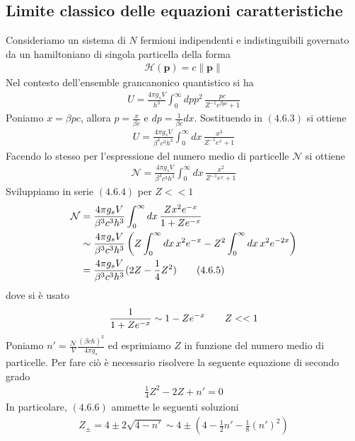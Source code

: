 \documentclass{article}
\begin{document}
\subsection{Limite classico delle equazioni caratteristiche}
Consideriamo un sistema di $N$ fermioni indipendenti e indistinguibili governato da un hamiltoniano di singola particella della forma
\begin{align}
    \mathcal{H}(\mathbf{p}) = c\|\mathbf{p}\| \tag{4.6.1}
\end{align}
Nel contesto dell'ensemble grancanonico quantistico si ha
\begin{align}
    U = \frac{4\pi g_sV}{h^3}\int_0^\infty dp p^2 \, \frac{pc}{Z^{-1}e^{\beta pc} + 1} \tag{4.6.2}
\end{align}
Poniamo $x = \beta pc$, allora $p = \frac{x}{\beta c}$ e $dp = \frac{1}{\beta c}dx$. Sostituendo in $(4.6.3)$ si ottiene 
\begin{align}
    U = \frac{4\pi g_sV}{\beta^4c^3h^3}\int_0^\infty dx \, \frac{x^3}{Z^{-1}e^x + 1} \tag{4.6.3} 
\end{align}
Facendo lo stesso per l'espressione del numero medio di particelle $\mathcal{N}$ si ottiene
\begin{align}
    \mathcal{N} = \frac{4\pi g_sV}{\beta^3c^3h^3}\int_0^\infty dx \, \frac{x^2}{Z^{-1}e^x + 1} \tag{4.6.4}
\end{align}
Sviluppiamo in serie $(4.6.4)$ per $Z << 1$
\begin{align}
    \mathcal{N} &= \frac{4\pi g_sV}{\beta^3c^3h^3}\int_0^\infty dx \, \frac{Zx^2e^{-x}}{1 + Ze^{-x}} \notag \\&\sim \frac{4\pi g_sV}{\beta^3c^3h^3}\left(Z\int_0^\infty dx \, x^2e^{-x} - Z^2\int_0^\infty dx \, x^2e^{-2x}\right) \notag \\
    &= \frac{4\pi g_s V}{\beta^3c^3h^3}(2Z - \frac{1}{4}Z^2) \tag{4.6.5}
\end{align}
dove si è usato 
\begin{align}
    \frac{1}{1 + Ze^{-x}} \sim 1 - Ze^{-x} \qquad Z << 1 \notag
\end{align}
Poniamo $n' = \frac{\mathcal{N}}{V}\frac{(\beta ch)^3}{4\pi g_s}$ ed esprimiamo $Z$ in funzione del numero medio di particelle. Per fare ciò è necessario risolvere la seguente equazione di secondo grado
\begin{align}
    \frac{1}{4}Z^2 - 2Z + n' = 0 \tag{4.6.6}
\end{align}
In particolare, $(4.6.6)$ ammette le seguenti soluzioni
\begin{align}
    Z_{\pm} = 4 \pm 2\sqrt{4 - n'} \sim 4 \pm \left(4 - \frac{1}{2}n' - \frac{1}{8}(n')^2\right) \tag{4.6.7}
\end{align}
\end{document}
